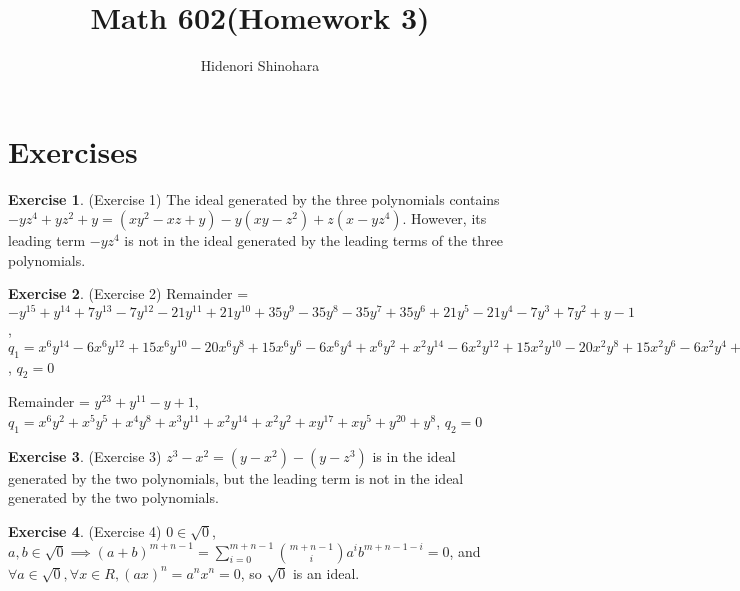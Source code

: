 \documentclass[12pt, psamsfonts]{amsart}
\theoremstyle{definition}
\newtheorem*{exer}{Exercise}
\theoremstyle{remark}
\numberwithin{equation}{section}
\begin{document}
\title{Math 602(Homework 3)}
\author{Hidenori Shinohara}
\maketitle

\section{Exercises}

\begin{exer}{(Exercise 1)}
  The ideal generated by the three polynomials contains $-yz^4 + yz^2 + y = (xy^2 - xz + y) - y(xy - z^2) + z(x - yz^4)$.
  However, its leading term $-yz^4$ is not in the ideal generated by the leading terms of the three polynomials. 
\end{exer}

\begin{exer}{(Exercise 2)}
Remainder = $-y^{15} + y^{14} + 7 y^{13} - 7 y^{12} - 21 y^{11} + 21 y^{10} + 35 y^{9} - 35 y^{8} - 35 y^{7} + 35 y^{6} + 21 y^{5} - 21 y^{4} - 7 y^{3} + 7 y^{2} + y - 1$,
$q_1 = x^{6}y^{14} - 6 x^{6}y^{12} + 15 x^{6}y^{10} - 20 x^{6}y^{8} + 15 x^{6}y^{6} - 6 x^{6}y^{4} + x^{6}y^{2} + x^{2}y^{14} - 6 x^{2}y^{12} + 15 x^{2}y^{10} - 20 x^{2}y^{8} + 15 x^{2}y^{6} - 6 x^{2}y^{4} + x^{2}y^{2}$,
$q_2 = 0$
 
Remainder = $y^{23} + y^{11} - y + 1$,
$q_1 = x^{6}y^{2} + x^{5}y^{5} + x^{4}y^{8} + x^{3}y^{11} + x^{2}y^{14} + x^{2}y^{2} + xy^{17} + xy^{5} + y^{20} + y^{8}$,
$q_2 = 0$
\end{exer}

\begin{exer}{(Exercise 3)}
  $z^3 - x^2 = (y - x^2) - (y - z^3)$ is in the ideal generated by the two polynomials, but the leading term is not in the ideal generated by the two polynomials.
\end{exer}

\begin{exer}{(Exercise 4)}
  $0 \in \sqrt{0}$, $a, b \in \sqrt{0} \implies (a + b)^{m + n - 1} = \sum_{i=0}^{m + n - 1} \binom{m + n - 1}{i} a^ib^{m + n - 1 - i} = 0$, and $\forall a \in \sqrt{0}, \forall x \in R, (ax)^n = a^nx^n = 0$, so $\sqrt{0}$ is an ideal.
\end{exer}
\end{document}

